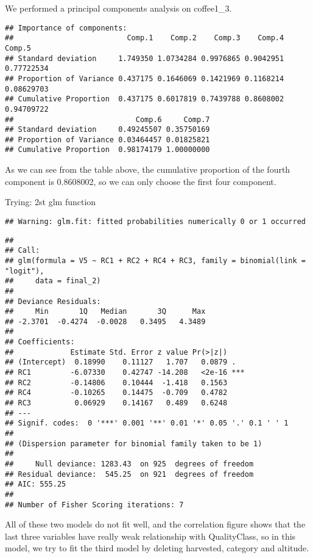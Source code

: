 \documentclass[
]{article}
\begin{document}
We performed a principal components analysis on coffee1\_3.

\begin{verbatim}
## Importance of components:
##                          Comp.1    Comp.2    Comp.3    Comp.4     Comp.5
## Standard deviation     1.749350 1.0734284 0.9976865 0.9042951 0.77722534
## Proportion of Variance 0.437175 0.1646069 0.1421969 0.1168214 0.08629703
## Cumulative Proportion  0.437175 0.6017819 0.7439788 0.8608002 0.94709722
##                            Comp.6     Comp.7
## Standard deviation     0.49245507 0.35750169
## Proportion of Variance 0.03464457 0.01825821
## Cumulative Proportion  0.98174179 1.00000000
\end{verbatim}

As we can see from the table above, the cumulative proportion of the
fourth component is 0.8608002, so we can only choose the first four
component.

Trying: 2st glm function

\begin{verbatim}
## Warning: glm.fit: fitted probabilities numerically 0 or 1 occurred
\end{verbatim}

\begin{verbatim}
## 
## Call:
## glm(formula = V5 ~ RC1 + RC2 + RC4 + RC3, family = binomial(link = "logit"), 
##     data = final_2)
## 
## Deviance Residuals: 
##     Min       1Q   Median       3Q      Max  
## -2.3701  -0.4274  -0.0028   0.3495   4.3489  
## 
## Coefficients:
##             Estimate Std. Error z value Pr(>|z|)    
## (Intercept)  0.18990    0.11127   1.707   0.0879 .  
## RC1         -6.07330    0.42747 -14.208   <2e-16 ***
## RC2         -0.14806    0.10444  -1.418   0.1563    
## RC4         -0.10265    0.14475  -0.709   0.4782    
## RC3          0.06929    0.14167   0.489   0.6248    
## ---
## Signif. codes:  0 '***' 0.001 '**' 0.01 '*' 0.05 '.' 0.1 ' ' 1
## 
## (Dispersion parameter for binomial family taken to be 1)
## 
##     Null deviance: 1283.43  on 925  degrees of freedom
## Residual deviance:  545.25  on 921  degrees of freedom
## AIC: 555.25
## 
## Number of Fisher Scoring iterations: 7
\end{verbatim}

All of these two models do not fit well, and the correlation figure
shows that the last three variables have really weak relationship with
QualityClass, so in this model, we try to fit the third model by
deleting harvested, category and altitude.
\end{document}
